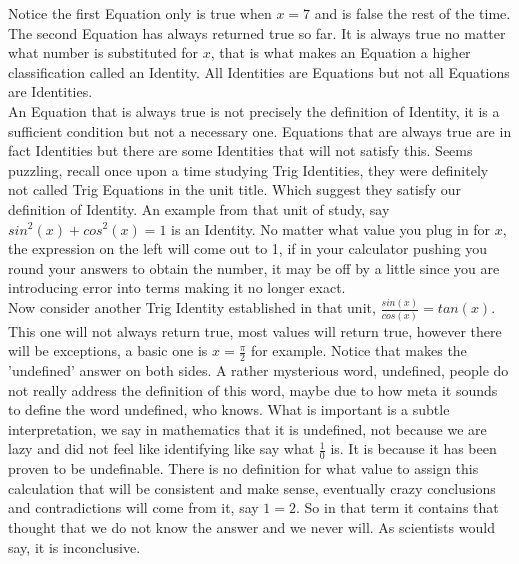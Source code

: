 \documentclass[12pt]{article}
\begin{document}
\vspace{10pt}

Notice the first Equation only is true when $x=7$ and is false the rest of the time. The second Equation has always returned true so far. It is always true no matter what number is substituted for $x$, that is what makes an Equation a higher classification called an Identity. All Identities are Equations but not all Equations are Identities. \\

An Equation that is always true is not precisely the definition of Identity, it is a sufficient condition but not a necessary one. Equations that are always true are in fact Identities but there are some Identities that will not satisfy this. Seems puzzling, recall once upon a time studying Trig Identities, they were definitely not called Trig Equations in the unit title. Which suggest they satisfy our definition of Identity. An example from that unit of study, say $sin^2(x)+cos^2(x)=1$ is an Identity. No matter what value you plug in for $x$, the expression on the left will come out to 1, if in your calculator pushing you round your answers to obtain the number, it may be off by a little since you are introducing error into terms making it no longer exact. \\

Now consider another Trig Identity established in that unit, $\frac{sin(x)}{cos(x)}=tan(x)$. This one will not always return true, most values will return true, however there will be exceptions, a basic one is $x=\frac{\pi}{2}$ for example. Notice that makes the 'undefined' answer on both sides. A rather mysterious word, undefined, people do not really address the definition of this word, maybe due to how meta it sounds to define the word undefined, who knows. What is important is a subtle interpretation, we say in mathematics that it is undefined, not because we are lazy and did not feel like identifying like say what $\frac{1}{0}$ is. It is because it has been proven to be undefinable. There is no definition for what value to assign this calculation that will be consistent and make sense, eventually crazy conclusions and contradictions will come from it, say $1=2$. So in that term it contains that thought that we do not know the answer and we never will. As scientists would say, it is inconclusive. \\
\end{document}
